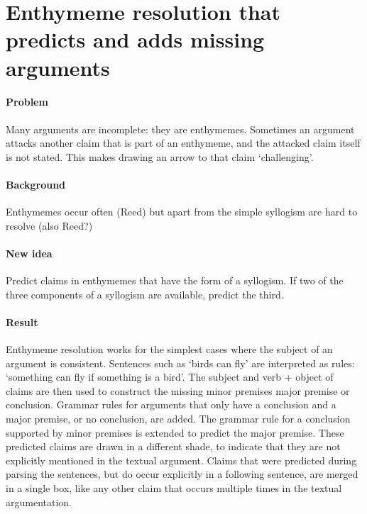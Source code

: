 \documentclass{article}
\let\stdsection\section
\renewcommand\section{\newpage\stdsection}
\begin{document}
\section{Enthymeme resolution that predicts and adds missing arguments}

\paragraph{Problem} Many arguments are incomplete: they are enthymemes. Sometimes an argument attacks another claim that is part of an enthymeme, and the attacked claim itself is not stated. This makes drawing an arrow to that claim `challenging'.
\paragraph{Background} Enthymemes occur often (Reed) but apart from the simple syllogism are hard to resolve (also Reed?)
\paragraph{New idea} Predict claims in enthymemes that have the form of a syllogism. If two of the three components of a syllogism are available, predict the third.
\paragraph{Result} Enthymeme resolution works for the simplest cases where the subject of an argument is consistent. Sentences such as `birds can fly' are interpreted as rules: `something can fly if something is a bird'. The subject and verb + object of claims are then used to construct the missing minor premises major premise or conclusion. Grammar rules for arguments that only have a conclusion and a major premise, or no conclusion, are added. The grammar rule for a conclusion supported by minor premises is extended to predict the major premise. These predicted claims are drawn in a different shade, to indicate that they are not explicitly mentioned in the textual argument. Claims that were predicted during parsing the sentences, but do occur explicitly in a following sentence, are merged in a single box, like any other claim that occurs multiple times in the textual argumentation.
\end{document}
